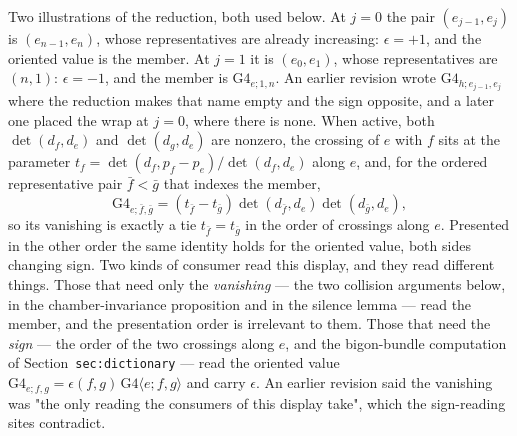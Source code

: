 \begin{definition}
\begin{enumerate}
Two illustrations of the reduction, both used below. At $j=0$ the pair
$(e_{j-1},e_j)$ is $(e_{n-1},e_n)$, whose representatives are already
increasing: $\epsilon=+1$, and the oriented value is the member. At $j=1$ it is
$(e_0,e_1)$, whose representatives are $(n,1)$: $\epsilon=-1$, and the member
is $\mathrm{G4}_{e;1,n}$. An earlier revision wrote
$\mathrm{G4}_{h;e_{j-1},e_j}$ where the reduction makes that name empty and the
sign opposite, and a later one placed the wrap at $j=0$, where there is none. When active, both
$\det(d_f,d_e)$ and $\det(d_g,d_e)$ are nonzero, the crossing of $e$ with $f$
sits at the parameter $t_f=\det(d_f,p_f-p_e)/\det(d_f,d_e)$ along $e$, and, for
the ordered representative pair $\bar f<\bar g$ that indexes the member,
\[
   \mathrm{G4}_{e;\bar f,\bar g}
      =(t_{\bar f}-t_{\bar g})\det(d_{\bar f},d_e)\det(d_{\bar g},d_e),
\]
so its vanishing is exactly a tie $t_{\bar f}=t_{\bar g}$ in the order of
crossings along $e$. Presented in the other order the same identity holds for the oriented value,
both sides changing sign. Two kinds of consumer read this display, and they read
different things. Those that need only the \emph{vanishing} --- the two collision arguments
below, in the chamber-invariance proposition and in the silence lemma --- read
the member, and the presentation order is irrelevant to them. Those that
need the \emph{sign} --- the order of the two crossings along $e$, and the
bigon-bundle computation of Section~\texttt{sec:dictionary} --- read the oriented
value $\widehat{\mathrm{G4}}_{e;f,g}=\epsilon(f,g)\,\mathrm{G4}\langle
e;f,g\rangle$ and carry $\epsilon$. An earlier revision said the vanishing was
"the only reading the consumers of this display take", which the sign-reading
sites contradict.
\end{enumerate}
\end{definition}

